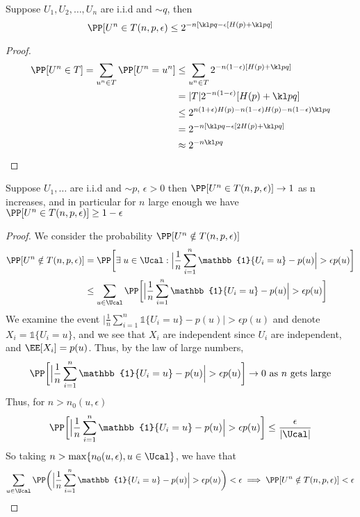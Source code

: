 \begin{corollary}
Suppose $U_1, U_2, \dots, U_n$ are i.i.d and $\sim q$, then
\[ \PP[U^n \in T(n,p,\epsilon) \leq 2^{-n[\kl pq - \epsilon[H(p) + \kl pq]}\]
\end{corollary}
\begin{proof}
\begin{align*}
    \PP[U^n \in T] = \sum_{u^n \in T} \PP[U^n = u^n] & \leq \sum_{u^n \in T} 2^{-n(1-\epsilon) [H(p) + \kl pq]} \\
    &= |T| 2^{-n(1-\epsilon)} [H(p) + \kl pq] \\
    &\leq 2^{n(1+\epsilon) H(p) - n(1-\epsilon) H(p) - n(1-\epsilon) \kl pq} \\
    &= 2^{-n[\kl pq - \epsilon[2H(p) + \kl pq]} \\
    &\approx 2^{-n \kl pq}
\end{align*}
\end{proof}
\begin{theorem}
Suppose $U_1, \dots$ are i.i.d and $\sim p$, $\epsilon > 0$ then $\PP[U^n \in T(n,p,\epsilon)] \to 1$ as n increases, and in particular for $n$ large enough
we have $\PP[U^n \in T(n,p,\epsilon)] \geq 1 - \epsilon$
\end{theorem}
\begin{proof}
We consider the probability $\PP[U^n \notin T(n,p,\epsilon)]$ 
\begin{align*}
\PP[U^n \notin T(n,p,\epsilon)] &= \PP\bigg[\exists\; u \in \Ucal: \Big|\frac{1}{n} \sum_{i=1}^n \mathbb{1}\{U_i = u\} - p(u)\Big| > \epsilon p(u) \bigg] \\
&\leq \sum_{u \in \Ucal} \PP\bigg[\Big|\frac{1}{n} \sum_{i=1}^n \mathbb{1}\{U_i = u\} - p(u)\Big| > \epsilon p(u) \bigg] 
\end{align*}
We examine the event $\Big|\frac{1}{n} \sum_{i=1}^n \mathbb{1}\{U_i = u\} - p(u)\Big| > \epsilon p(u)$ and denote $X_i = \mathbb{1}\{U_i = u\}$, and we see that $X_i$ are independent since $U_i$ are independent, and $\EE[X_i] = p(u)$. Thus, by the law of large numbers, 
\[\PP\bigg[\Big|\frac{1}{n} \sum_{i=1}^n \mathbb{1}\{U_i = u\} - p(u)\Big| > \epsilon p(u)\bigg] \to 0 \text{ as $n$ gets large}\]
Thus, for $n > n_0(u, \epsilon)$
\[\PP\bigg[\Big|\frac{1}{n} \sum_{i=1}^n \mathbb{1}\{U_i = u\} - p(u)\Big| > \epsilon p(u)\bigg] \leq \frac{\epsilon}{|\Ucal|} \]
So taking $n > \max\{n_0(u, \epsilon), u \in \Ucal\}$, we have that 
\[\sum_{u \in \Ucal} \PP\bigg(\Big|\frac{1}{n} \sum_{i=1}^n \mathbb{1}\{U_i = u\} - p(u)\Big| > \epsilon p(u)\bigg) < \epsilon \implies \PP[U^n \notin T(n,p,\epsilon)] < \epsilon \]
\end{proof}
